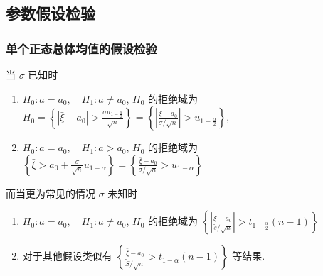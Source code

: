 \documentclass[10pt]{yerbaformat}
\begin{document}
\subsection{参数假设检验}
\subsubsection{单个正态总体均值的假设检验}

\par 当 $\sigma$ 已知时
\begin{enumerate}
    \item $H_{0}: a=a_{0}, \quad H_{1}: a \neq a_{0}$, $H_{0}$ 的拒绝域为 $H_{0}=\left\{\left|\bar{\xi}-a_{0}\right|>\frac{\sigma u_{1-\frac{\alpha}{2}}}{\sqrt{n}}\right\}=\left\{\left|\frac{\xi-a_{0}}{\sigma / \sqrt{n}}\right|>u_{1-\frac{\alpha}{2}}\right\},$
    \item $H_{0}: a=a_{0}, \quad H_{1}: a>a_{0}$, $H_{0}$ 的拒绝域为 $\left\{\bar{\xi}>a_{0}+\frac{\sigma}{\sqrt{n}} u_{1-\alpha}\right\}=\left\{\frac{\bar{\xi}-a_{0}}{\sigma / \sqrt{n}}>u_{1-\alpha}\right\}$
\end{enumerate}

\par 而当更为常见的情况 $\sigma$ 未知时
\begin{enumerate}
    \item $H_{0}: a=a_{0}, \quad H_{1}: a \neq a_{0}$, $H_{0}$ 的拒绝域为 $\left\{\left|\frac{\bar{\xi}-a_{0}}{\tilde{s} / \sqrt{n}}\right|>t_{1-\frac{\alpha}{2}}(n-1)\right\}$
    \item 对于其他假设类似有 $\left\{\frac{\bar{\xi}-a_{0}}{\tilde{S} / \sqrt{n}}>t_{1-\alpha}(n-1)\right\}$ 等结果.
\end{enumerate}
\end{document}
